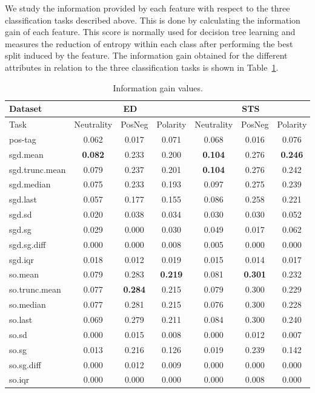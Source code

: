 \documentclass{sig-alternate}
\begin{document}
We study the information provided by each feature with respect to the three classification tasks described above. This is done by calculating the information gain of each feature. This score is normally used for decision tree learning and  measures the reduction of entropy within each class after performing the best split induced by the feature. The information gain obtained for the different attributes in relation to the three classification tasks is shown in Table~\ref{tab:infogains}.
 
\begin{table}[htb]
\footnotesize
\centering
\begin{tabular}{l|ccc|ccc}
\hline
Dataset & \multicolumn{3}{c|}{ED} & \multicolumn{3}{c}{STS} \\ \hline
 Task &  Neutrality & PosNeg & Polarity &  Neutrality & PosNeg & Polarity  \\ \hline
pos-tag &  0.062 & 0.017  & 0.071 & 0.068 & 0.016 & 0.076  \\ 
sgd.mean & \textbf{0.082}  & 0.233  &  0.200 & \textbf{0.104} & 0.276 & \textbf{0.246}  \\ 
sgd.trunc.mean & 0.079 & 0.237 & 0.201 & \textbf{0.104} & 0.276 & 0.242 \\ 
sgd.median & 0.075 & 0.233 & 0.193  & 0.097 & 0.275 & 0.239 \\ 
sgd.last & 0.057 & 0.177 & 0.155  & 0.086 & 0.258 & 0.221  \\ 
sgd.sd & 0.020 & 0.038 & 0.034  & 0.030 & 0.030 & 0.052 \\
sgd.sg & 0.029 & 0.000 & 0.030 & 0.049 & 0.017 & 0.062 \\
sgd.sg.diff &  0.000 & 0.000 & 0.008 & 0.005 & 0.000 & 0.000 \\ 
sgd.iqr &  0.018 & 0.012 & 0.019 & 0.015 & 0.014 & 0.017 \\ 
so.mean & 0.079 & 0.283 & \textbf{0.219}  & 0.081 & \textbf{0.301} & 0.232 \\ 
so.trunc.mean & 0.077 & \textbf{0.284} & 0.215 & 0.079 & 0.300 & 0.229 \\ 
so.median & 0.077 & 0.281 & 0.215 & 0.076 & 0.300 & 0.228 \\
so.last & 0.069 & 0.279  &  0.211 & 0.084 & 0.300 & 0.240  \\  
so.sd  & 0.000 & 0.015 & 0.008 & 0.000 & 0.012 & 0.007 \\
so.sg &  0.013 & 0.216 & 0.126 & 0.019 & 0.239 & 0.142 \\ 
so.sg.diff & 0.000 & 0.012 & 0.009 & 0.000 & 0.000 & 0.000 \\
so.iqr & 0.000 & 0.000 & 0.000  & 0.000 & 0.008 & 0.000 \\      \hline
\end{tabular}
\caption{Information gain values.}
\label{tab:infogains}
\end{table}
 
\end{document}
